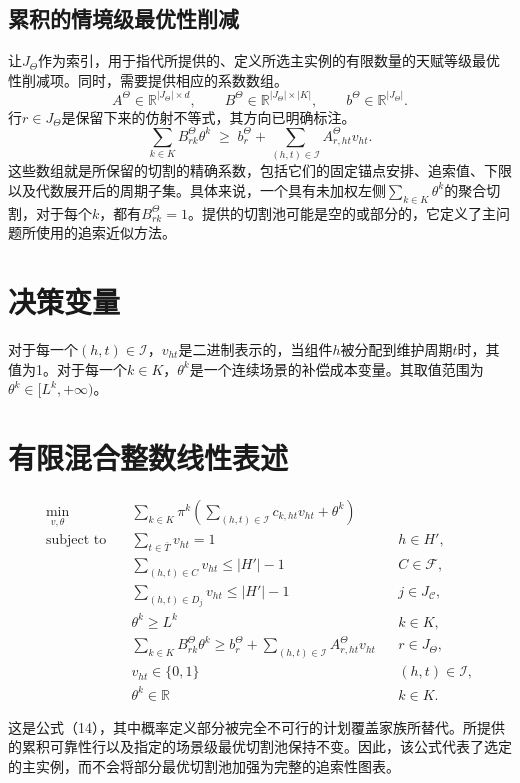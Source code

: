 \documentclass[11pt]{article}
\begin{document}
\subsection{累积的情境级最优性削减}
让$J_{\Theta}$作为索引，用于指代所提供的、定义所选主实例的有限数量的天赋等级最优性削减项。同时，需要提供相应的系数数组。
\[
A^{\Theta}\in\mathbb R^{|J_{\Theta}|\times d},\qquad
B^{\Theta}\in\mathbb R^{|J_{\Theta}|\times|K|},\qquad
b^{\Theta}\in\mathbb R^{|J_{\Theta}|}.
\]
行$r\in J_{\Theta}$是保留下来的仿射不等式，其方向已明确标注。
\[
\sum_{k\in K}B^{\Theta}_{rk}\theta^k
\;\geq\;
b^{\Theta}_r+
\sum_{(h,t)\in\mathcal I}A^{\Theta}_{r,ht}v_{ht}.
\]
这些数组就是所保留的切割的精确系数，包括它们的固定锚点安排、追索值、下限以及代数展开后的周期子集。具体来说，一个具有未加权左侧$\sum_{k\in K}\theta^k$的聚合切割，对于每个$k$，都有$B^{\Theta}_{rk}=1$。提供的切割池可能是空的或部分的，它定义了主问题所使用的追索近似方法。

\section{决策变量}
对于每一个$(h,t)\in\mathcal I$，$v_{ht}$是二进制表示的，当组件$h$被分配到维护周期$t$时，其值为1。对于每一个$k\in K$，$\theta^k$是一个连续场景的补偿成本变量。其取值范围为$\theta^k\in[L^k,+\infty)$。

\section{有限混合整数线性表述}
\begin{align}
\min_{v,\theta}\quad
 &\sum_{k\in K}\pi^k
 \left(\sum_{(h,t)\in\mathcal I}c_{k,ht}v_{ht}+\theta^k\right)
 \label{eq:objective}\\
\text{subject to}\quad
 &\sum_{t\in\bar T}v_{ht}=1
 &&h\in H',\label{eq:assignment}\\
 &\sum_{(h,t)\in C}v_{ht}\leq |H'|-1
 &&C\in\mathscr F,\label{eq:exact-reliability}\\
 &\sum_{(h,t)\in D_j}v_{ht}\leq |H'|-1
 &&j\in J_{\mathcal C},\label{eq:accumulated-covers}\\
 &\theta^k\geq L^k
 &&k\in K,\label{eq:lower-bounds}\\
 &\sum_{k\in K}B^{\Theta}_{rk}\theta^k
 \geq b^{\Theta}_r+
 \sum_{(h,t)\in\mathcal I}A^{\Theta}_{r,ht}v_{ht}
 &&r\in J_{\Theta},\label{eq:optimality-cuts}\\
 &v_{ht}\in\{0,1\}
 &&(h,t)\in\mathcal I,\\
 &\theta^k\in\mathbb R
 &&k\in K.
\end{align}

这是公式（14），其中概率定义部分被完全不可行的计划覆盖家族所替代。所提供的累积可靠性行以及指定的场景级最优切割池保持不变。因此，该公式代表了选定的主实例，而不会将部分最优切割池加强为完整的追索性图表。
\end{document}
